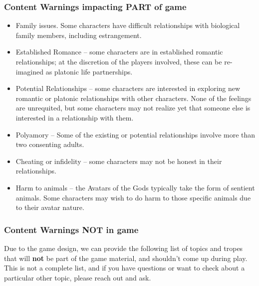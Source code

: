 \documentclass[sheet]{GL2020}
\begin{document}
\subsubsection{Content Warnings impacting PART of game}
\begin{multicols}{2}
\begin{itemize}
  	\item Family issues. Some characters have difficult relationships with biological family members, including estrangement.
	\item Established Romance -- some characters are in established romantic relationships; at the discretion of the players involved, these can be re-imagined as platonic life partnerships.
	\item Potential Relationships -- some characters are interested in exploring new romantic or platonic relationships with other characters. None of the feelings are unrequited, but some characters may not realize yet that someone else is interested in a relationship with them.
	\item Polyamory -- Some of the existing or potential relationships involve more than two consenting adults.
	\item Cheating or infidelity -- some characters may not be honest in their relationships.
	\item Harm to animals -- the Avatars of the Gods typically take the form of sentient animals. Some characters may wish to do harm to those specific animals due to their avatar nature.
\end{itemize}
\end{multicols}

\subsubsection{Content Warnings NOT in game}
Due to the game design, we can provide the following list of topics and tropes that will \textbf{not} be part of the game material, and shouldn’t come up during play. This is not a complete list, and if you have questions or want to check about a particular other topic, please reach out and ask.
\end{document}
